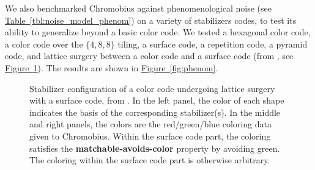 \documentclass[onecolumn,unpublished,a4paper]{quantumarticle}
\theoremstyle{definition}
\theoremstyle{definition}
\theoremstyle{definition}
\newcommand{\fig}[1]{\hyperref[fig:#1]{Figure~\ref*{fig:#1}}}
\newcommand{\tbl}[1]{\hyperref[tbl:#1]{Table~\ref*{tbl:#1}}}
\begin{document}
We also benchmarked Chromobius against phenomenological noise (see \tbl{noise_model_phenom}) on a variety of stabilizers codes, to test its ability to generalize beyond a basic color code.
We tested a hexagonal color code, a color code over the $\{4,8,8\}$ tiling, a surface code, a repetition code, a pyramid code, and lattice surgery between a color code and a surface code (from \cite{shutty2022colorsurfacemerge}, see \fig{color2surface}).
The results are shown in \fig{phenom}.

\begin{figure}
    \centering
    \caption{
        Stabilizer configuration of a color code undergoing lattice surgery with a surface code, from \cite{shutty2022colorsurfacemerge}.
        In the left panel, the color of each shape indicates the basis of the corresponding stabilizer(s).
        In the middle and right panels, the colors are the red/green/blue coloring data given to Chromobius.
        Within the surface code part, the coloring satisfies the \textbf{matchable-avoids-color} property by avoiding green.
        The coloring within the surface code part is otherwise arbitrary.
    }
    \label{fig:color2surface}
\end{figure}
\end{document}
